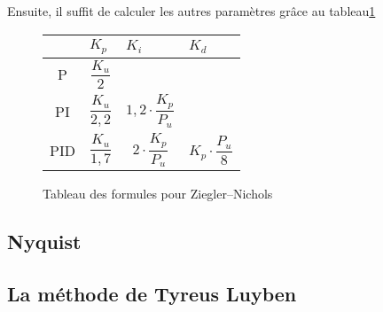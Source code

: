 Ensuite, il suffit de calculer les autres paramètres grâce au tableau\ref{tab:ZieglerNicholsTuningFormulas}

\def\tabularxcolumn#1{m{#1}}
\begin{figure}[ht]
	\begin{center}
		\begin{tabularx}{\textwidth}{| c | X | X | X |}
			\hline
			& $K_p$ & $K_i$ & $K_d$\\ \hline
			P & \begin{equation*}\frac{K_u}{2}\end{equation*} & &\\ \hline
			PI & \begin{equation*}\frac{K_u}{2,2}\end{equation*} & \begin{equation*}1,2 \cdot \frac{K_p}{P_u}\end{equation*} &\\ \hline
			PID & \begin{equation*}\frac{K_u}{1,7}\end{equation*} & \begin{equation*}2 \cdot \frac{K_p}{P_u}\end{equation*} & \begin{equation*}K_p \cdot \frac{P_u}{8}\end{equation*} \\
			\hline
		\end{tabularx}
	\end{center}
	\caption{Tableau des formules pour Ziegler–Nichols}
	\label{tab:ZieglerNicholsTuningFormulas}
\end{figure}

\subsection{Nyquist}

\subsection{La méthode de Tyreus Luyben}
